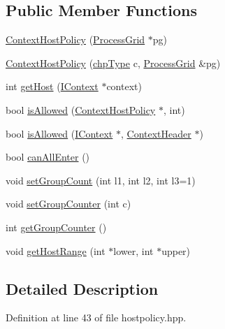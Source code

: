 \subsection*{Public Member Functions}
\begin{DoxyCompactItemize}
\item 
\hyperlink{class_context_host_policy_a6e46676fe884df637db21b89ca698966}{ContextHostPolicy} (\hyperlink{class_process_grid}{ProcessGrid} $\ast$pg)
\item 
\hyperlink{class_context_host_policy_aadf1b0bd209574d0b3a6c17dbdfed5eb}{ContextHostPolicy} (\hyperlink{class_context_host_policy_a8050b2efb974f28cbabe561cb04989a1}{chpType} c, \hyperlink{class_process_grid}{ProcessGrid} \&pg)
\item 
int \hyperlink{class_context_host_policy_a463cff37397e882a9e7d164c7d33527e}{getHost} (\hyperlink{class_i_context}{IContext} $\ast$context)
\item 
bool \hyperlink{class_context_host_policy_ada4604e88c103b12a8d2a2a8c533dada}{isAllowed} (\hyperlink{class_context_host_policy}{ContextHostPolicy} $\ast$, int)
\item 
bool \hyperlink{class_context_host_policy_aa10ca0985dfed1351b9ef69fbe97f1f4}{isAllowed} (\hyperlink{class_i_context}{IContext} $\ast$, \hyperlink{class_context_header}{ContextHeader} $\ast$)
\item 
bool \hyperlink{class_context_host_policy_a78e3cff62d65667d5b4ea715b411a2c8}{canAllEnter} ()
\item 
void \hyperlink{class_context_host_policy_a46740f08a26323e21734995fa08c4c0c}{setGroupCount} (int l1, int l2, int l3=1)
\item 
void \hyperlink{class_context_host_policy_a7705f176010456efe3dfed9cbb351e2b}{setGroupCounter} (int c)
\item 
int \hyperlink{class_context_host_policy_a4281d32782181a79b2000f28fbb1b771}{getGroupCounter} ()
\item 
void \hyperlink{class_context_host_policy_aff4f859ac0102e7ad268f17aff1b0259}{getHostRange} (int $\ast$lower, int $\ast$upper)
\end{DoxyCompactItemize}


\subsection{Detailed Description}


Definition at line 43 of file hostpolicy.hpp.

